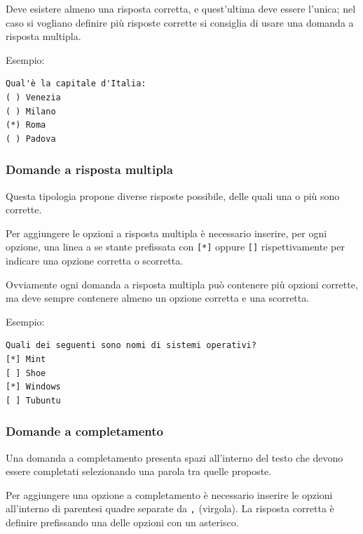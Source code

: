 \documentclass[12pt,a4paper]{article}
\begin{document}
\par Deve esistere almeno una risposta corretta, e quest'ultima deve essere l'unica; nel caso si vogliano definire più risposte corrette si consiglia di usare una domanda a risposta multipla. \\

\par Esempio: \\
\begin{verbatim}
Qual'è la capitale d'Italia:
( ) Venezia
( ) Milano
(*) Roma
( ) Padova
\end{verbatim}

\subsubsection{Domande a risposta multipla}

\par Questa tipologia propone diverse risposte possibile, delle quali una o più sono corrette. \\

\par Per aggiungere le opzioni a risposta multipla è necessario inserire, per ogni opzione, una linea a se stante prefissata con \texttt{[*]} oppure \texttt{[]} rispettivamente per indicare una opzione corretta o scorretta. \\

\par Ovviamente ogni domanda a risposta multipla può contenere più opzioni corrette, ma deve sempre contenere almeno un opzione corretta e una scorretta. \\

\par Esempio: \\
\begin{verbatim}
Quali dei seguenti sono nomi di sistemi operativi?
[*] Mint
[ ] Shoe
[*] Windows
[ ] Tubuntu
\end{verbatim}

\subsubsection{Domande a completamento}

\par Una domanda a completamento presenta spazi all'interno del testo che devono essere completati selezionando una parola tra quelle proposte. \\

\par Per aggiungere una opzione a completamento è necessario inserire le opzioni all'interno di parentesi quadre separate da \texttt{,} (virgola). La risposta corretta è definire prefissando una delle opzioni con un asterisco. \\
\end{document}
